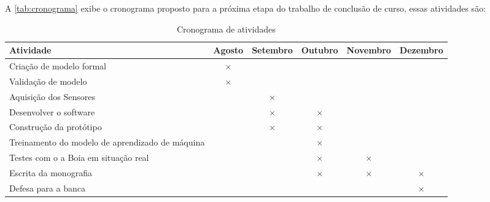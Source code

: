 \label{chapter:cronograma}

A \autoref{tab:cronograma} exibe o cronograma proposto para a próxima etapa do trabalho de conclusão de curso, essas atividades são:

\begin{table}[htbp]
  \centering
  \caption{Cronograma de atividades}
  \label{tab:cronograma}
  \begin{tabularx}{\textwidth}{|X|c|c|c|c|c|}
    \hline
    \textbf{Atividade} & \textbf{Agosto} & \textbf{Setembro} & \textbf{Outubro} & \textbf{Novembro} & \textbf{Dezembro} \\
    \hline
    Criação de modelo formal & \(\times\) & & & & \\
    \hline
    Validação de modelo & \(\times\) &  &  & & \\
    \hline
    Aquisição dos Sensores & & \(\times\)  &  & & \\
    \hline
    Desenvolver o software & & \(\times\)  & \(\times\) & & \\
    \hline
    Construção da protótipo &  & \(\times\) &  \(\times\) & & \\
   \hline
    Treinamento do modelo de aprendizado de máquina & & & \(\times\) & &  \\
    \hline
    Testes com o a Boia em situação real & & & \(\times\) & \(\times\) &  \\
    \hline
    Escrita da monografia & & & \(\times\) & \(\times\) &  \(\times\)\\
    \hline
    Defesa para a banca & & & & & \(\times\)  \\
    \hline
  \end{tabularx}
\end{table}